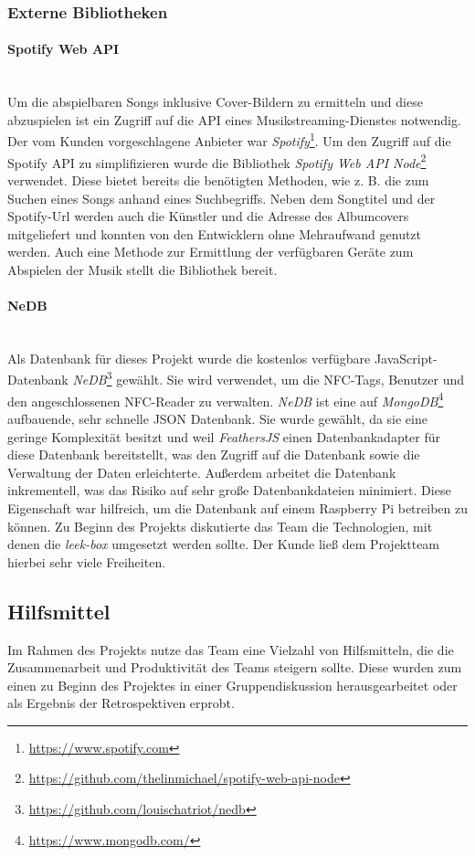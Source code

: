 \documentclass[10pt, a4paper]{article}
\begin{document}
\subsubsection{Externe Bibliotheken}
\paragraph{Spotify Web API} $~$ \\
Um die abspielbaren Songs inklusive Cover-Bildern zu ermitteln und diese abzuspielen ist ein Zugriff auf die API eines Musikstreaming-Dienstes notwendig.
Der vom Kunden vorgeschlagene Anbieter war \textit{Spotify}\footnote{\url{https://www.spotify.com}}.
Um den Zugriff auf die Spotify API zu simplifizieren wurde die Bibliothek \textit{Spotify Web API Node}\footnote{\url{https://github.com/thelinmichael/spotify-web-api-node}} verwendet.
Diese bietet bereits die benötigten Methoden, wie z. B. die zum Suchen eines Songs anhand eines Suchbegriffs.
Neben dem Songtitel und der Spotify-Url werden auch die Künstler und die Adresse des Albumcovers mitgeliefert und konnten von den Entwicklern ohne Mehraufwand genutzt werden.
Auch eine Methode zur Ermittlung der verfügbaren Geräte zum Abspielen der Musik stellt die Bibliothek bereit.

\paragraph{NeDB} $~$ \\
Als Datenbank für dieses Projekt wurde die kostenlos verfügbare JavaScript-Datenbank \textit{NeDB}\footnote{\raggedright\url{https://github.com/louischatriot/nedb}} gewählt.
Sie wird verwendet, um die NFC-Tags, Benutzer und den angeschlossenen NFC-Reader zu verwalten.
\textit{NeDB} ist eine auf \textit{MongoDB}\footnote{\raggedright\url{https://www.mongodb.com/}} aufbauende, sehr schnelle JSON Datenbank.
Sie wurde gewählt, da sie eine geringe Komplexität besitzt und weil \textit{FeathersJS} einen Datenbankadapter für diese Datenbank bereitstellt, was den Zugriff auf die Datenbank sowie die Verwaltung der Daten erleichterte.
Außerdem arbeitet die Datenbank inkrementell, was das Risiko auf sehr große Datenbankdateien minimiert.
Diese Eigenschaft war hilfreich, um die Datenbank auf einem Raspberry Pi betreiben zu können.
Zu Beginn des Projekts diskutierte das Team die Technologien, mit denen die \textit{leek-box} umgesetzt werden sollte.
Der Kunde ließ dem Projektteam hierbei sehr viele Freiheiten.

\subsection{Hilfsmittel}
Im Rahmen des Projekts nutze das Team eine Vielzahl von Hilfsmitteln, die die Zusammenarbeit und Produktivität des Teams steigern sollte.
Diese wurden zum einen zu Beginn des Projektes in einer Gruppendiskussion herausgearbeitet oder als Ergebnis der Retrospektiven erprobt.
\end{document}
